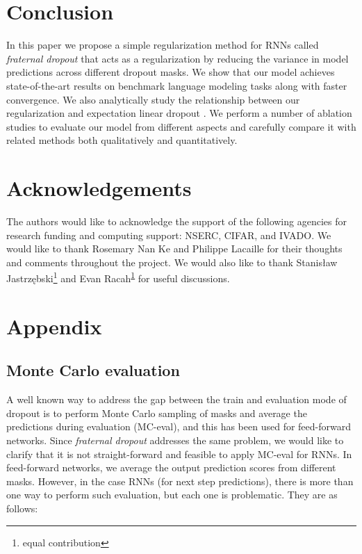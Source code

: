 \documentclass{article} \usepackage{iclr2018_conference,times}
\begin{document}
\section{Conclusion}
In this paper we propose a simple regularization method for RNNs called \emph{fraternal dropout} that acts as a regularization by reducing the variance in model predictions across different dropout masks. We show that our model achieves state-of-the-art results on benchmark language modeling tasks along with faster convergence. We also analytically study the relationship between our regularization and expectation linear dropout \cite{ma2016dropout}. We perform a number of ablation studies to evaluate our model from different aspects and carefully compare it with related methods both qualitatively and quantitatively.

\ificlrfinal
\section*{Acknowledgements}
\setcounter{footnote}{1}
\def\thefootnote{\fnsymbol{footnote}}
The authors would like to acknowledge the support of the following agencies for research funding and computing support: NSERC, CIFAR, and IVADO. We would like to thank Rosemary Nan Ke and Philippe Lacaille for their thoughts and comments throughout the project. We would also like to thank Stanis\l{}aw Jastrz\k{e}bski\footnote{\label{eq_con}equal contribution } and Evan Racah\textsuperscript{\ref{eq_con}} for useful discussions.
\fi




\newpage
\appendix

\section*{Appendix}
\subsection*{Monte Carlo evaluation}

A well known way to address the gap between the train and evaluation mode of dropout is to perform Monte Carlo sampling of masks and average the predictions during evaluation (MC-eval), and this has been used for feed-forward networks. Since \emph{fraternal dropout} addresses the same problem, we would like to clarify that it is not straight-forward and feasible to apply MC-eval for RNNs. In feed-forward networks, we average the output prediction scores from different masks. However, in the case RNNs (for next step predictions), there is more than one way to perform such evaluation, but each one is problematic. They are as follows:
\end{document}
